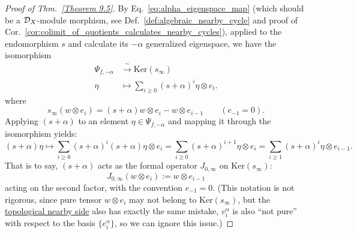 \begin{proof}[Proof of Thm.~\ref{Theorem 9.5}]
    By Eq.~\ref{eq:alpha_eigenspace_map} (which should be a $\mathcal{D}_X$-module morphism, see Def.~\ref{def:algebraic_nearby_cycle} and proof of Cor.~\ref{cor:colimit_of_quotients_calculates_nearby_cycles}), applied to the endomorphism $s$ and calculate its $-\alpha$ generalized eigenspace, we have the isomorphism
    \begin{align*}
        \Psi_{f,-\alpha} & \xrightarrow{\;\sim\;} \mathrm{Ker}(s_{\infty})                          \\
        \eta             & \longmapsto \sum\limits_{i \geqslant 0} (s+\alpha)^i \eta\otimes  e_{i}.
    \end{align*}
    where
    \[
        s_{\infty}(w \otimes e_i)=(s+\alpha)w \otimes e_i - w \otimes e_{i-1}
        \qquad (e_{-1}=0).
    \]
    Applying $(s+\alpha)$ to an element $\eta \in \Psi_{f,-\alpha}$ and mapping it through the isomorphism yields:
    \[
        (s+\alpha)\eta \longmapsto \sum_{i \geqslant 0} (s+\alpha)^i (s+\alpha)\eta \otimes e_i =  \sum_{i \geqslant 0} (s+\alpha)^{i+1} \eta \otimes e_i = \sum_{i \geqslant 1} (s+\alpha)^i \eta \otimes e_{i-1}.
    \]
    That is to say, $(s+\alpha)$ acts as the formal operator $J_{0,\infty}$ on $\mathrm{Ker}(s_{\infty})$:
    \[
        J_{0,\infty}(w \otimes e_i) := w \otimes e_{i-1}
    \]
    acting on the second factor, with the convention $e_{-1}=0$.
    (This notation is not rigorous,
    since pure tensor $w \otimes e_i$ may not belong to $\mathrm{Ker}(s_{\infty})$,
    but the \hyperref[eq:local_system_L^lambda_m]{topological nearby side} also has exactly the same mistake,
    $v^\alpha_i$ is also ``not pure'' with respect to the basis $\{e^\alpha_i\}$, so we can ignore this issue.)


    \medskip


\end{proof}
